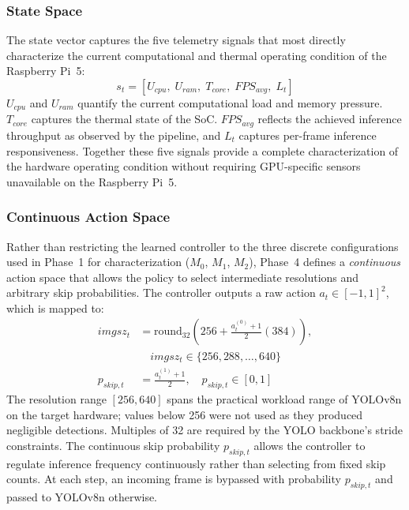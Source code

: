 \documentclass{ieeeaccess}
\begin{document}
\subsubsection*{State Space}

The state vector captures the five telemetry signals that most directly
characterize the current computational and thermal operating condition of
the Raspberry Pi~5:
\begin{equation}
s_t = [U_{cpu},\; U_{ram},\; T_{core},\; FPS_{avg},\; L_t]
\end{equation}
$U_{cpu}$ and $U_{ram}$ quantify the current computational load and memory
pressure. $T_{core}$ captures the thermal state of the SoC. $FPS_{avg}$
reflects the achieved inference throughput as observed by the pipeline, and
$L_t$ captures per-frame inference responsiveness. Together these five signals
provide a complete characterization of the hardware operating condition without
requiring GPU-specific sensors unavailable on the Raspberry Pi~5.

\subsubsection*{Continuous Action Space}

Rather than restricting the learned controller to the three discrete
configurations used in Phase~1 for characterization ($M_0$, $M_1$, $M_2$),
Phase~4 defines a \emph{continuous} action space that allows the policy to
select intermediate resolutions and arbitrary skip probabilities. The
controller outputs a raw action $a_t \in [-1,1]^2$, which is mapped to:
\begin{align}
imgsz_t &= \mathrm{round}_{32}\!\left(256 + \tfrac{a_t^{(0)}+1}{2}(384)\right), \nonumber\\
&\quad imgsz_t \in \{256, 288, \ldots, 640\} \\
p_{skip,t} &= \tfrac{a_t^{(1)}+1}{2},\quad p_{skip,t} \in [0,1]
\end{align}
The resolution range $[256, 640]$ spans the practical workload range of
YOLOv8n on the target hardware; values below 256 were not used as they
produced negligible detections. Multiples of 32 are required by the YOLO
backbone's stride constraints. The continuous skip probability $p_{skip,t}$
allows the controller to regulate inference frequency continuously rather
than selecting from fixed skip counts. At each step, an incoming frame is
bypassed with probability $p_{skip,t}$ and passed to YOLOv8n otherwise.
\end{document}
